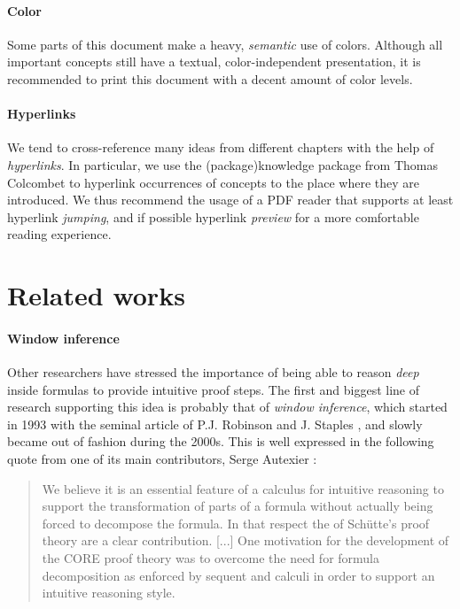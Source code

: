 \paragraph{Color}

Some parts of this document make a heavy, \emph{semantic} use of colors.
Although all important concepts still have a textual, color-independent
presentation, it is recommended to print this document with a decent amount of
color levels.

\paragraph{Hyperlinks}
  
We tend to cross-reference many ideas from different chapters with the help of
\emph{hyperlinks}. In particular, we use the \kl(package){knowledge} package
from Thomas Colcombet to hyperlink occurrences of concepts to the place where
they are introduced. We thus recommend the usage of a PDF reader that supports
at least hyperlink \emph{jumping}, and if possible hyperlink \emph{preview} for
a more comfortable reading experience.


\section{Related works}

\paragraph{Window inference}

Other researchers have stressed the importance of being able to reason
\emph{deep} inside formulas to provide intuitive proof steps. The first and
biggest line of research supporting this idea is probably that of \emph{window
inference}, which started in 1993 with the seminal article of P.J. Robinson and
J. Staples , and slowly became out of
fashion during the 2000s. This is well expressed in the following quote from one
of its main contributors, Serge Autexier :

\begin{quote}
We believe it is an essential feature of a calculus for intuitive reasoning to
support the transformation of parts of a formula without actually being forced
to decompose the formula. In that respect the  of Schütte's proof
theory are a clear contribution. [...] One motivation for the development of the
CORE proof theory was to overcome the need for formula decomposition as enforced
by sequent and  calculi in order to support an intuitive
reasoning style.
\end{quote}

